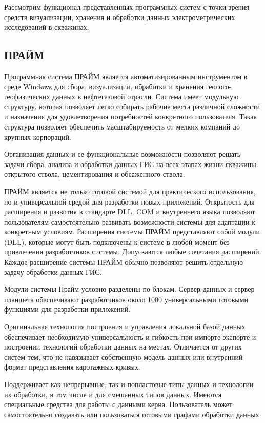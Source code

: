 Рассмотрим функционал представленных программных систем с точки зрения
средств визуализации, хранения и обработки данных электрометрических
исследований в скважинах.

\subsection{ПРАЙМ} \label{subsect_Prime}
Программная система ПРАЙМ является автоматизированным инструментом в среде
Windows для сбора, визуализации, обработки и хранения геолого-геофизических
данных в нефтегазовой отрасли. Система имеет модульную структуру, которая
позволяет легко собирать рабочие места различной сложности и назначения для
удовлетворения потребностей конкретного пользователя. Такая структура
позволяет обеспечить масштабируемость от мелких компаний до крупных
корпораций.

Организация данных и ее функциональные возможности позволяют решать задачи
сбора, анализа и обработки данных ГИС на всех этапах жизни скважины:
открытого ствола, цементирования и обсаженного ствола.

ПРАЙМ является не только готовой системой для практического использования,
но и универсальной средой для разработки новых приложений. Открытость для
расширения и развития в стандарте DLL, COM и внутреннего языка позволяют
пользователям самостоятельно развивать возможности системы для адаптации к
конкретным условиям. Расширения системы ПРАЙМ представляют собой модули
(DLL), которые могут быть подключены к системе в любой момент без
привлечения разработчиков системы. Допускаются любые сочетания расширений.
Каждое расширение системы ПРАЙМ обычно позволяют решить отдельную задачу
обработки данных ГИС.

Модули системы Прайм условно разделены по блокам. Сервер данных и сервер
планшета обеспечивают разработчиков около 1000 универсальными готовыми
функциями для разработки приложений.

Оригинальная технология построения и управления локальной базой данных
обеспечивает необходимую универсальность и гибкость при импорте-экспорте и
построении технологий обработки данных на местах. Отличается от других
систем тем, что не навязывает собственную модель данных или внутренний
формат представления каротажных кривых.

Поддерживает как непрерывные, так и попластовые типы данных и технологии их
обработки, в том числе и для смешанных типов данных. Имеются специальные
средства для работы с данными керна. Пользователь может самостоятельно
создавать или пользоваться готовыми графами обработки данных.

